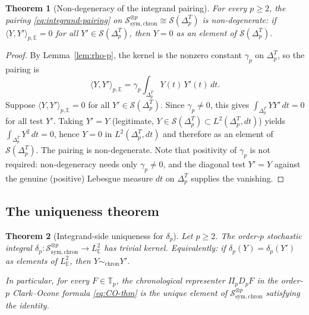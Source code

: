 \documentclass[11pt,reqno]{amsart}
\theoremstyle{plain}
\newtheorem{theorem}{Theorem}[section]
\theoremstyle{definition}
\newcommand{\E}{\mathbb{E}}
\newcommand{\sym}{\mathrm{sym}}
\newcommand{\Schw}{\mathcal{S}}
\newcommand{\simplex}{\Delta_p^T}
\newcommand{\chron}{\mathrm{chron}}
\begin{document}
\begin{theorem}[Non-degeneracy of the integrand pairing]
\label{thm:nondegen}
For every $p \geq 2$, the pairing \eqref{eq:integrand-pairing} on $\Schw_{\sym, \chron}^{\otimes p} \cong \Schw(\simplex)$ is non-degenerate: if $\langle Y, Y' \rangle_{p, \E} = 0$ for all $Y' \in \Schw(\simplex)$, then $Y = 0$ as an element of $\Schw(\simplex)$.
\end{theorem}

\begin{proof}
By Lemma~\ref{lem:rho-p}, the kernel is the nonzero constant $\gamma_p$ on $\simplex$, so the pairing is
\begin{equation}
\langle Y, Y' \rangle_{p, \E} = \gamma_p \int_{\simplex} Y(t)\, Y'(t)\, dt .
\end{equation}
Suppose $\langle Y, Y'\rangle_{p,\E} = 0$ for all $Y' \in \Schw(\simplex)$. Since $\gamma_p \neq 0$, this gives $\int_{\simplex} Y Y'\, dt = 0$ for all test $Y'$. Taking $Y' = Y$ (legitimate, $Y \in \Schw(\simplex) \subset L^2(\simplex, dt)$) yields $\int_{\simplex} Y^2\, dt = 0$, hence $Y = 0$ in $L^2(\simplex, dt)$ and therefore as an element of $\Schw(\simplex)$. The pairing is non-degenerate. Note that positivity of $\gamma_p$ is not required: non-degeneracy needs only $\gamma_p \neq 0$, and the diagonal test $Y'=Y$ against the genuine (positive) Lebesgue measure $dt$ on $\simplex$ supplies the vanishing.
\end{proof}

\subsection{The uniqueness theorem}

\begin{theorem}[Integrand-side uniqueness for $\delta_p$]
\label{thm:uniqueness}
Let $p \geq 2$. The order-$p$ stochastic integral $\delta_p : \Schw_{\sym, \chron}^{\otimes p} \to L^2_\E$ has trivial kernel. Equivalently: if $\delta_p(Y) = \delta_p(Y')$ as elements of $L^2_\E$, then $Y \sim_{\chron} Y'$.

In particular, for every $F \in \mathbb{T}_p$, the chronological representer $\Pi_p D_p F$ in the order-$p$ Clark--Ocone formula \eqref{eq:CO-thm} is the unique element of $\Schw_{\sym, \chron}^{\otimes p}$ satisfying the identity.
\end{theorem}
\end{document}

